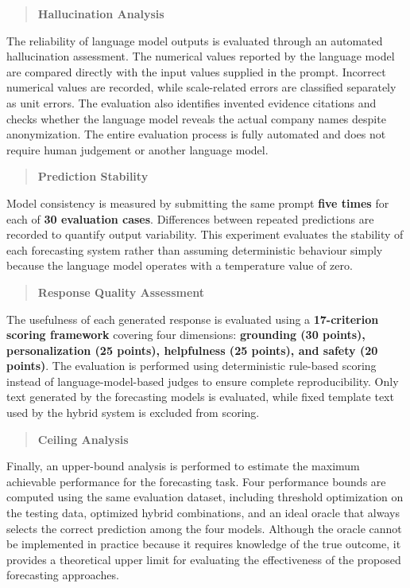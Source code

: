 \begin{quote}
\textbf{Hallucination Analysis}
\end{quote}

The reliability of language model outputs is evaluated through an
automated hallucination assessment. The numerical values reported by the
language model are compared directly with the input values supplied in
the prompt. Incorrect numerical values are recorded, while scale-related
errors are classified separately as unit errors. The evaluation also
identifies invented evidence citations and checks whether the language
model reveals the actual company names despite anonymization. The entire
evaluation process is fully automated and does not require human
judgement or another language model.

\begin{quote}
\textbf{Prediction Stability}
\end{quote}

Model consistency is measured by submitting the same prompt \textbf{five
times} for each of \textbf{30 evaluation cases}. Differences between
repeated predictions are recorded to quantify output variability. This
experiment evaluates the stability of each forecasting system rather
than assuming deterministic behaviour simply because the language model
operates with a temperature value of zero.

\begin{quote}
\textbf{Response Quality Assessment}
\end{quote}

The usefulness of each generated response is evaluated using a
\textbf{17-criterion scoring framework} covering four dimensions:
\textbf{grounding (30 points), personalization (25 points), helpfulness
(25 points), and safety (20 points)}. The evaluation is performed using
deterministic rule-based scoring instead of language-model-based judges
to ensure complete reproducibility. Only text generated by the
forecasting models is evaluated, while fixed template text used by the
hybrid system is excluded from scoring.

\begin{quote}
\textbf{Ceiling Analysis}
\end{quote}

Finally, an upper-bound analysis is performed to estimate the maximum
achievable performance for the forecasting task. Four performance bounds
are computed using the same evaluation dataset, including threshold
optimization on the testing data, optimized hybrid combinations, and an
ideal oracle that always selects the correct prediction among the four
models. Although the oracle cannot be implemented in practice because it
requires knowledge of the true outcome, it provides a theoretical upper
limit for evaluating the effectiveness of the proposed forecasting
approaches.
